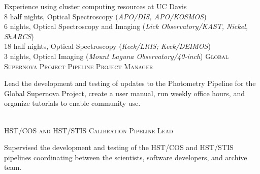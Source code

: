 \documentclass[10pt]{cv}
\begin{document}
\begin{llist}
Experience using cluster computing resources at UC Davis\\ 
%
\vspace{-0.1in}   
8 half nights, Optical Spectroscopy (\textit{APO/DIS, APO/KOSMOS})\\
6 nights, Optical Spectroscopy and Imaging ({\it Lick Observatory/KAST, Nickel, ShARCS})\\
18 half nights, Optical Spectroscopy ({\it Keck/LRIS; Keck/DEIMOS})\\
3 nights, Optical Imaging ({\it Mount Laguna Observatory/40-inch})
%
\textsc{Global Supernova Project Pipeline Project Manager}\\
\begin{minipage}[l]{0.7\textwidth}\vspace{0.15cm}
Lead the development and testing of updates to the Photometry Pipeline for the Global Supernova Project, create a user manual, run weekly office hours, and organize tutorials to enable community use. \\
\end{minipage}\vspace{0.15cm}
\\
\textsc{HST/COS and HST/STIS Calibration Pipeline Lead}\\
\begin{minipage}[l]{0.7\textwidth}\vspace{0.15cm}
Supervised the development and testing of the HST/COS and HST/STIS pipelines coordinating between the scientists, software developers, and archive team. \\

\end{minipage}
\end{llist}
\end{document}
